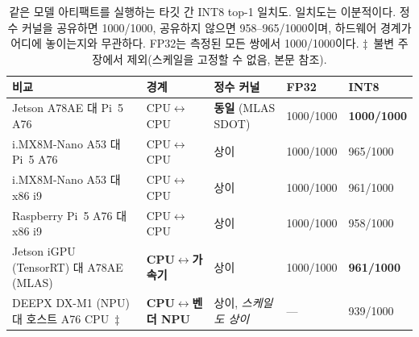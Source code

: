 \documentclass[11pt]{article}
\begin{document}
\begin{table}[htbp]
\centering
\small
\begin{tabular}{L{4.4cm} L{2.7cm} L{3.0cm} C{1.3cm} C{1.5cm}}
\toprule
\textbf{비교} & \textbf{경계} & \textbf{정수 커널} & \textbf{FP32} & \textbf{INT8} \\
\midrule
Jetson A78AE 대 Pi~5 A76 & CPU$\leftrightarrow$CPU & \textbf{동일} (MLAS SDOT) & 1000/1000 & \textbf{1000/1000} \\
i.MX8M-Nano A53 대 Pi~5 A76 & CPU$\leftrightarrow$CPU & 상이 & 1000/1000 & 965/1000 \\
i.MX8M-Nano A53 대 x86 i9 & CPU$\leftrightarrow$CPU & 상이 & 1000/1000 & 961/1000 \\
Raspberry Pi~5 A76 대 x86 i9 & CPU$\leftrightarrow$CPU & 상이 & 1000/1000 & 958/1000 \\
Jetson iGPU (TensorRT) 대 A78AE (MLAS) & \textbf{CPU$\leftrightarrow$가속기} & 상이 & 1000/1000 & \textbf{961/1000} \\
DEEPX DX-M1 (NPU) 대 호스트 A76 CPU~$\ddagger$ & \textbf{CPU$\leftrightarrow$벤더 NPU} & 상이, \emph{스케일도 상이} & --- & 939/1000 \\
\bottomrule
\end{tabular}
\caption{같은 모델 아티팩트를 실행하는 타깃 간 INT8 top-1 일치도. 일치도는 이분적이다. 정수 커널을 공유하면 1000/1000, 공유하지 않으면 958--965/1000이며, 하드웨어 경계가 어디에 놓이는지와 무관하다. FP32는 측정된 모든 쌍에서 1000/1000이다. $\ddagger$~불변 주장에서 제외(스케일을 고정할 수 없음, 본문 참조).}
\label{tab:c2}
\end{table}
\end{document}
